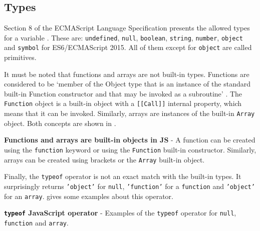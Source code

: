



\subsection{Types}
Section 8 of the ECMAScript Language Specification presents the allowed types for a variable \citep{ecma-script}. These are: \texttt{undefined}, \texttt{null}, \texttt{boolean}, \texttt{string}, \texttt{number}, \texttt{object} and \texttt{symbol} for ES6/ECMAScript 2015. All of them except for \texttt{object} are called primitives.

It must be noted that functions and arrays are not built-in types. Functions are considered to be `member of the Object type that is an instance of the standard built-in Function constructor and that may be invoked as a subroutine' \citep{ecma-script}. The \texttt{Function} object is a built-in object with a \texttt{[[Call]]} internal property, which means that it can be invoked. Similarly, arrays are instances of the built-in \texttt{Array} object. Both concepts are shown in .

\begin{code}
	\captionsetup{aboveskip=0pt, belowskip=10pt}
	\caption[Functions and arrays are built-in objects in JS]{\textbf{Functions and arrays are built-in objects in JS} - A function can be created using the \texttt{function} keyword or using the \texttt{Function} built-in constructor. Similarly, arrays can be created using brackets or the \texttt{Array} built-in object.}
	\label{code:background-functions-and-arrays}
\end{code}

Finally, the \texttt{typeof} operator is not an exact match with the built-in types. It surprisingly returns \texttt{'object'} for \texttt{null}, \texttt{'function'} for a \texttt{function} and \texttt{'object'} for an \texttt{array}.  gives some examples about this operator.

\begin{code}
	\captionsetup{aboveskip=0pt, belowskip=10pt}
	\caption[typeof JavaScript operator]{\textbf{\texttt{typeof} JavaScript operator} - Examples of the \texttt{typeof} operator for \texttt{null}, \texttt{function} and \texttt{array}.}
	\label{code:background-javascript-typeof}
\end{code}

